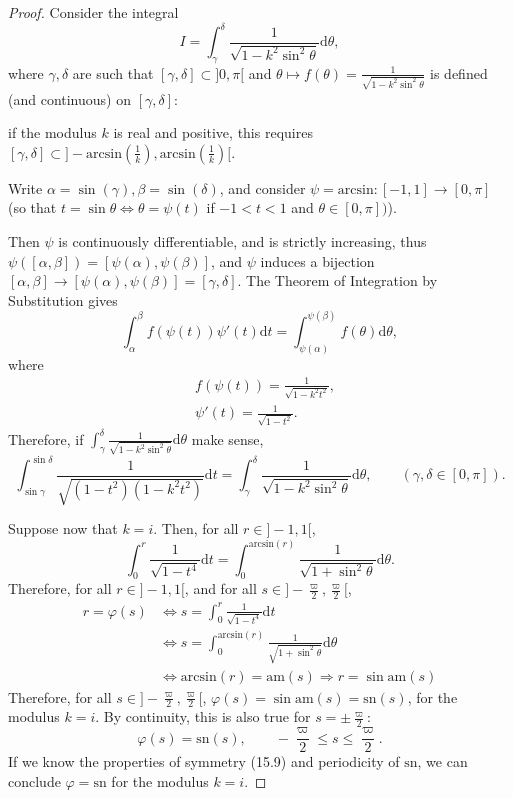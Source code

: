 \documentclass[11pt,a4paper]{article}
\newcommand{\D}{\mathrm{d}}
\begin{document}
\begin{proof} 
Consider the integral
$$I = \int_\gamma^\delta \frac{1}{\sqrt{1 - k^2 \sin^2 \theta}} \D \theta,$$
where $\gamma, \delta$ are such that $[\gamma, \delta] \subset ]0,\pi[$ and $ \theta \mapsto  f(\theta) =  \frac{1}{\sqrt{1 - k^2 \sin^2 \theta}}$ is defined (and continuous) on $[\gamma, \delta]$: 

if the modulus $k$ is real and positive, this requires $[\gamma,\delta] \subset  ]-\mathrm{arcsin}\left(\frac{1}{k}\right), \mathrm{arcsin}\left(\frac{1}{k}\right)[$.

Write $\alpha = \sin(\gamma), \beta = \sin(\delta)$, and consider $\psi = \mathrm{arcsin} : [-1,1] \to [0,\pi]$ (so that $t = \sin \theta \iff \theta = \psi(t)$ if $-1<t<1$ and $\theta \in [0,\pi])$).

Then $\psi$ is continuously differentiable, and is strictly increasing, thus $\psi([\alpha,\beta]) = [\psi(\alpha),\psi(\beta)]$, and $\psi$ induces a bijection $[\alpha, \beta] \to [\psi(\alpha),\psi(\beta)] = [\gamma, \delta]$. The Theorem of Integration by Substitution gives
$$\int_\alpha^\beta f(\psi(t)) \psi'(t) \D t = \int_{\psi(\alpha)}^{\psi(\beta)} f(\theta) \D \theta,$$
where
\begin{align*}
&f(\psi(t)) = \frac{1}{\sqrt{1-k^2 t^2}},\\
&\psi'(t) = \frac{1}{\sqrt{1-t^2}}.
\end{align*}
Therefore, if $\int_\gamma^\delta \frac{1}{\sqrt{1 - k^2 \sin^2 \theta}} \D \theta$ make sense,
$$\int_{\sin \gamma}^{\sin \delta} \frac{1}{\sqrt{(1-t^2)(1-k^2t^2)}} \D t = \int_\gamma^\delta \frac{1}{\sqrt{1 - k^2 \sin^2 \theta}} \D \theta,\qquad (\gamma, \delta \in [0,\pi]).$$

\bigskip

Suppose now that $k = i$. Then, for all $r \in ]-1,1[$, 
$$\int_0^r \frac{1}{\sqrt{1-t^4}} \D t = \int_0^{\mathrm{arcsin}(r)}  \frac{1}{\sqrt{1 + \sin^2 \theta}} \D \theta.$$
Therefore, for all $r \in ]-1,1[$, and for all $s \in ]-\frac{\varpi}{2}, \frac{\varpi}{2}[$,
\begin{align*}
r = \varphi(s) &\iff s = \int_0^r \frac{1}{\sqrt{1-t^4}} \D t \\
&\iff s =  \int_0^{\mathrm{arcsin}(r)}  \frac{1}{\sqrt{1 + \sin^2 \theta}} \D \theta\\
&\iff \mathrm{arcsin}(r) = \mathrm{am}(s) \Rightarrow r = \sin \mathrm{am}(s)
\end{align*}
Therefore, for all $s \in ]-\frac{\varpi}{2}, \frac{\varpi}{2}[$, $\varphi(s) = \sin \mathrm{am}(s) = \mathrm{sn}(s)$, for the modulus $k = i$.
By continuity, this is also true for $s = \pm \frac{\varpi}{2}$:
$$\varphi(s) =  \mathrm{sn}(s), \qquad -\frac{\varpi}{2}\leq s \leq\frac{\varpi}{2}.$$
If we know the properties of symmetry (15.9) and periodicity of $\mathrm{sn}$, we can conclude $\varphi = \mathrm{sn}$ for the modulus $k=i$.
\end{proof}
\end{document}

